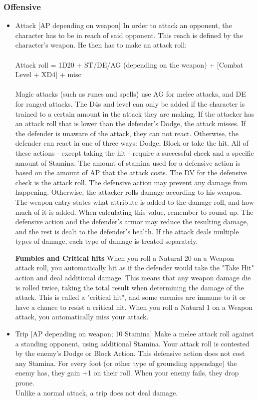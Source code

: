 \subsubsection{Offensive}\label{subsubsec:offensiveStaticCombatActions}
\begin{itemize}
\item Attack [AP depending on weapon]
In order to attack an opponent, the character has to be in reach of said opponent.
This reach is defined by the character's weapon.
He then has to make an attack roll:\\
\\
Attack roll = 1D20 + ST/DE/AG (depending on the weapon) + [Combat Level + XD4] + misc
\\
\\
Magic attacks (such as runes and spells) use AG for melee attacks, and DE for ranged attacks.
The D4s and level can only be added if the character is trained to a certain amount in the attack they are making.
If the attacker has an attack roll that is lower than the defender's Dodge, the attack misses.
If the defender is unaware of the attack, they can not react.
Otherwise, the defender can react in one of three ways: Dodge, Block or take the hit.
All of these actions - except taking the hit - require a successful check and a specific amount of Stamina.
The amount of stamina used for a defensive action is based on the amount of  AP that the attack costs.
The DV for the defensive check is the attack roll.
The defensive action may prevent any damage from happening.
Otherwise, the attacker rolls damage according to his weapon.
The weapon entry states what attribute is added to the damage roll, and how much of it is added.
When calculating this value, remember to round up.
The defensive action and the defender's armor may reduce the resulting damage, and the rest is dealt to the defender's health.
If the attack deals multiple types of damage, each type of damage is treated separately.


\textbf{Fumbles and Critical hits}
When you roll a Natural 20 on a Weapon attack roll, you automatically hit as if the defender would take the "Take Hit" action and deal additional damage.
This means that any weapon damage die is rolled twice, taking the total result when determining the damage of the attack.
This is called a "critical hit", and some enemies are immune to it or have a chance to resist a critical hit.
When you roll a Natural 1 on a Weapon attack, you automatically miss your attack.


\item Trip [AP depending on weapon; 10 Stamina]
Make a melee attack roll against a standing opponent, using additional Stamina.
Your attack roll is contested by the enemy's Dodge or Block Action.
This defensive action does not cost any Stamina.
For every foot (or other type of grounding appendage) the enemy has, they gain +1 on their roll.
When your enemy fails, they drop prone.\\
Unlike a normal attack, a trip does not deal damage.\\



\end{itemize}

